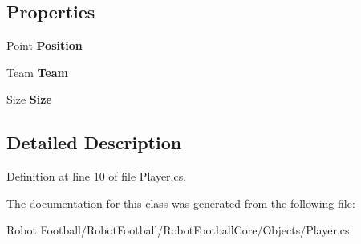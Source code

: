 \subsection*{Properties}
\begin{DoxyCompactItemize}
\item 
\hypertarget{class_robot_football_core_1_1_objects_1_1_player_a040b11e75c16402e4a6467b36ffdfcac}{Point {\bfseries Position}}\label{class_robot_football_core_1_1_objects_1_1_player_a040b11e75c16402e4a6467b36ffdfcac}

\item 
\hypertarget{class_robot_football_core_1_1_objects_1_1_player_ab42285bfcd5d869d01893387350bcc56}{Team {\bfseries Team}}\label{class_robot_football_core_1_1_objects_1_1_player_ab42285bfcd5d869d01893387350bcc56}

\item 
\hypertarget{class_robot_football_core_1_1_objects_1_1_player_a553f3eac81c3044b6f5ba8c062e7846e}{Size {\bfseries Size}}\label{class_robot_football_core_1_1_objects_1_1_player_a553f3eac81c3044b6f5ba8c062e7846e}

\end{DoxyCompactItemize}


\subsection{Detailed Description}


Definition at line 10 of file Player.\-cs.



The documentation for this class was generated from the following file\-:\begin{DoxyCompactItemize}
\item 
Robot Football/\-Robot\-Football/\-Robot\-Football\-Core/\-Objects/Player.\-cs\end{DoxyCompactItemize}
